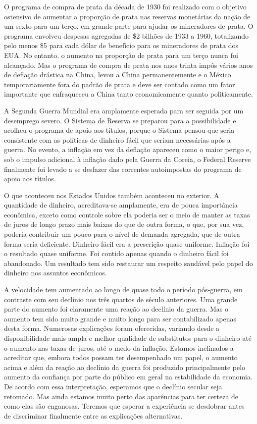 \documentclass[12pt]{article}
\begin{document}
O programa de compra de prata da década de 1930 foi realizado com o objetivo ostensivo de aumentar a proporção de prata nas reservas monetárias da nação de um sexto para um terço, em grande parte para ajudar os mineradores de prata. O programa envolveu despesas agregadas de \$2 bilhões de 1933 a 1960, totalizando pelo menos \$5 para cada dólar de benefício para os mineradores de prata dos EUA. No entanto, o aumento na proporção de prata para um terço nunca foi alcançado. Mas o programa de compra de prata nos anos trinta impôs vários anos de deflação drástica na China, levou a China permanentemente e o México temporariamente fora do padrão de prata e deve ser contado como um fator importante que enfraqueceu a China tanto economicamente quanto politicamente.

A Segunda Guerra Mundial era amplamente esperada para ser seguida por um desemprego severo. O Sistema de Reserva se preparou para a possibilidade e acolheu o programa de apoio aos títulos, porque o Sistema pensou que seria consistente com as políticas de dinheiro fácil que seriam necessárias após a guerra. No evento, a inflação em vez da deflação apareceu como o maior perigo e, sob o impulso adicional à inflação dado pela Guerra da Coreia, o Federal Reserve finalmente foi levado a se desfazer das correntes autoimpostas do programa de apoio aos títulos.

O que aconteceu nos Estados Unidos também aconteceu no exterior. A quantidade de dinheiro, acreditava-se amplamente, era de pouca importância econômica, exceto como controle sobre ela poderia ser o meio de manter as taxas de juros de longo prazo mais baixas do que de outra forma, o que, por sua vez, poderia contribuir um pouco para o nível de demanda agregada, que de outra forma seria deficiente. Dinheiro fácil era a prescrição quase uniforme. Inflação foi o resultado quase uniforme. Foi contido apenas quando o dinheiro fácil foi abandonado. Um resultado tem sido restaurar um respeito saudável pelo papel do dinheiro nos assuntos econômicos.

A velocidade tem aumentado ao longo de quase todo o período pós-guerra, em contraste com seu declínio nos três quartos de século anteriores. Uma grande parte do aumento foi claramente uma reação ao declínio da guerra. Mas o aumento tem sido muito grande e muito longo para ser contabilizado apenas desta forma. Numerosas explicações foram oferecidas, variando desde a disponibilidade mais ampla e melhor qualidade de substitutos para o dinheiro até o aumento nas taxas de juros, até o medo da inflação. Estamos inclinados a acreditar que, embora todos possam ter desempenhado um papel, o aumento acima e além da reação ao declínio da guerra foi produzido principalmente pelo aumento da confiança por parte do público em geral na estabilidade da economia. De acordo com essa interpretação, esperamos que o declínio secular seja retomado. Mas ainda estamos muito perto das aparências para ter certeza de como elas são enganosas. Teremos que esperar a experiência se desdobrar antes de discriminar finalmente entre as explicações alternativas.
\end{document}

